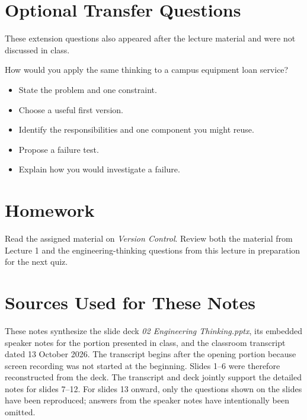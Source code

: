 \documentclass[11pt]{article}
\begin{document}
\section{Optional Transfer Questions}

These extension questions also appeared after the lecture material and were not discussed in class.
\begin{uncovered}
How would you apply the same thinking to a campus equipment loan service?
\end{uncovered}
\begin{uncovered}
\begin{itemize}
  \item State the problem and one constraint.
  \item Choose a useful first version.
  \item Identify the responsibilities and one component you might reuse.
  \item Propose a failure test.
  \item Explain how you would investigate a failure.
\end{itemize}
\end{uncovered}

\section*{Homework}
Read the assigned material on \emph{Version Control}. Review both the material from Lecture 1 and the engineering-thinking questions from this lecture in preparation for the next quiz.

\section*{Sources Used for These Notes}
These notes synthesize the slide deck \emph{02 Engineering Thinking.pptx}, its embedded speaker notes for the portion presented in class, and the classroom transcript dated 13 October 2026. The transcript begins after the opening portion because screen recording was not started at the beginning. Slides 1--6 were therefore reconstructed from the deck. The transcript and deck jointly support the detailed notes for slides 7--12. For slides 13 onward, only the questions shown on the slides have been reproduced; answers from the speaker notes have intentionally been omitted.
\end{document}
